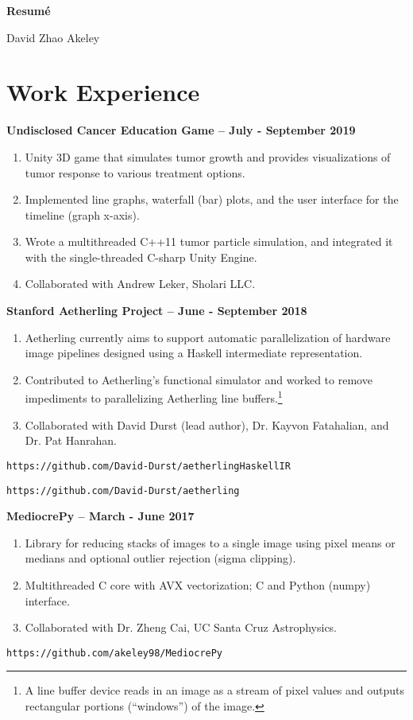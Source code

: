 \documentclass[11pt]{article}
\begin{document}
\begin{center}
\Large{\textbf{Resum\'e}}

\normalsize David Zhao Akeley
\end{center}

\section{Work Experience}

\textbf{Undisclosed Cancer Education Game -- July - September 2019}
\begin{enumerate}
\item Unity 3D game that simulates tumor growth and provides visualizations
  of tumor response to various treatment options.
\item Implemented line graphs, waterfall (bar) plots, and the user
  interface for the timeline (graph x-axis).
\item Wrote a multithreaded C++11 tumor particle simulation, and integrated
  it with the single-threaded C-sharp Unity Engine.
\item Collaborated with Andrew Leker, Sholari LLC.
\end{enumerate}

\textbf{Stanford Aetherling Project -- June - September 2018}
\begin{enumerate}
\item Aetherling currently aims to support automatic parallelization
  of hardware image pipelines designed using a Haskell intermediate
  representation.
\item Contributed to Aetherling's functional simulator and worked to
  remove impediments to parallelizing Aetherling line
  buffers.\footnote{A line buffer device reads in an image as a stream
    of pixel values and outputs rectangular portions (``windows'') of
    the image.}
\item Collaborated with David Durst (lead author), Dr. Kayvon
  Fatahalian, and Dr. Pat Hanrahan.
\end{enumerate}
\quad\texttt{https://github.com/David-Durst/aetherlingHaskellIR}

\quad\texttt{https://github.com/David-Durst/aetherling}

\textbf{MediocrePy -- March - June 2017}
\begin{enumerate}
\item Library for reducing stacks of images to a single image using pixel
means or medians and optional outlier rejection (sigma clipping).
\item Multithreaded C core with AVX vectorization; C and Python (numpy)
  interface.
\item Collaborated with Dr. Zheng Cai, UC Santa Cruz Astrophysics.
\end{enumerate}
\quad\texttt{https://github.com/akeley98/MediocrePy}
\end{document}
